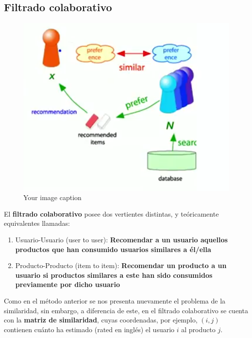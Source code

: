 \documentclass[14pt]{extarticle}
\begin{document}
\subsection{Filtrado colaborativo}

\begin{figure}[htbp]
    \centering
    \includegraphics[width=\textwidth]{./images/collaborative_filtering.png}
    \caption{Your image caption}
    \label{fig:your-image-label}
\end{figure}

El \textbf{filtrado colaborativo} posee dos vertientes distintas, y teóricamente equivalentes llamadas:

    \begin{enumerate}
        \item Usuario-Usuario (user to user): \textbf{Recomendar a un usuario aquellos productos que han consumido usuarios similares a él/ella}
        \item Producto-Producto (item to item): \textbf{Recomendar un producto a un usuario si productos similares a este han sido consumidos previamente por dicho usuario}
    \end{enumerate}

Como en el método anterior se nos presenta nuevamente el problema de la similaridad, sin embargo, a diferencia de este, en el filtrado colaborativo se cuenta con la \textbf{matriz de similaridad}, cuyas coordenadas, por ejemplo, $(i, j)$ contienen cuánto ha estimado (rated en inglés) el usuario $i$ al producto $j$. 
\end{document}
